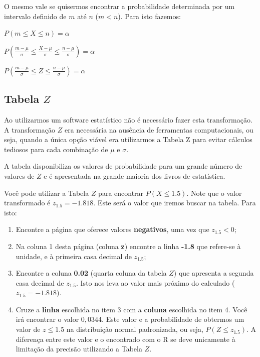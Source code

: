 \documentclass[
]{book}
\begin{document}
O mesmo vale se quisermos encontrar a probabilidade determinada por um intervalo definido de \(m\) até \(n\) (\(m < n\)). Para isto fazemos:

\(P(m \le X \le n) = \alpha\)

\(P(\frac{m - \mu}{\sigma} \le \frac{X - \mu}{\sigma} \le \frac{n - \mu}{\sigma}) = \alpha\)

\(P(\frac{m - \mu}{\sigma} \le Z \le \frac{n - \mu}{\sigma}) = \alpha\)

\hypertarget{tabela-z}{%
\subsection{\texorpdfstring{Tabela \(Z\)}{Tabela Z}}\label{tabela-z}}

Ao utilizarmos um software estatístico não é necessário fazer esta transformação. A transformação \(Z\) era necessária na ausência de ferramentas computacionais, ou seja, quando a única opção viável era utilizarmos a Tabela Z para evitar cálculos tediosos para cada combinação de \(\mu\) e \(\sigma\).

A tabela disponibiliza os valores de probabilidade para um grande número de valores de \(Z\) e é apresentada na grande maioria dos livros de estatística.

Você pode utilizar a Tabela \(Z\) para encontrar \(P(X \le 1.5)\). Note que o valor transformado é \(z_{1.5} = -1.818\). Este será o valor que iremos buscar na tabela. Para isto:

\begin{enumerate}
\def\labelenumi{\arabic{enumi}.}
\item
  Encontre a página que oferece valores \textbf{negativos}, uma vez que \(z_{1.5} < 0\);
\item
  Na coluna 1 desta página (coluna \textbf{z}) encontre a linha \textbf{-1.8} que refere-se à unidade, e à primeira casa decimal de \(z_{1.5}\);
\item
  Encontre a coluna \textbf{0.02} (quarta coluna da tabela \(Z\)) que apresenta a segunda casa decimal de \(z_{1.5}\). Isto nos leva ao valor mais próximo do calculado (\(z_{1.5} = -1.818\)).
\item
  Cruze a \textbf{linha} escolhida no item 3 com a \textbf{coluna} escolhida no item 4. Você irá encontrar o valor \(0,0344\). Este valor e a probabilidade de obtermos um valor de \(z \le 1.5\) na distribuição normal padronizada, ou seja, \(P(Z \le z_{1.5})\). A diferença entre este valor e o encontrado com o R se deve unicamente à limitação da precisão utilizando a Tabela \(Z\).
\end{enumerate}
\end{document}
